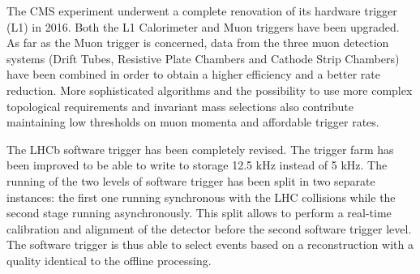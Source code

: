 The CMS experiment underwent a complete renovation of its hardware trigger (L1) in 2016.
Both the L1 Calorimeter and Muon triggers have been upgraded.
As far as the Muon trigger is concerned, data from the three muon detection systems (Drift Tubes, Resistive Plate Chambers and Cathode Strip Chambers) have been combined in order to obtain a higher efficiency and a better rate reduction. 
More sophisticated algorithms and the possibility to use more complex topological requirements and invariant mass selections also contribute maintaining low thresholds on muon momenta and affordable trigger rates.

The LHCb software trigger has been completely revised. 
The trigger farm has been improved to be able to write to storage 12.5 kHz instead of 5 kHz. The running of the two levels of software trigger has been split in two separate instances: 
the first one running synchronous with the LHC collisions while the second stage running asynchronously. 
This split allows to perform a real-time calibration and alignment of the detector before the second software trigger level.
The software trigger is thus able to select events based on a reconstruction with a quality identical to the offline processing.

%  